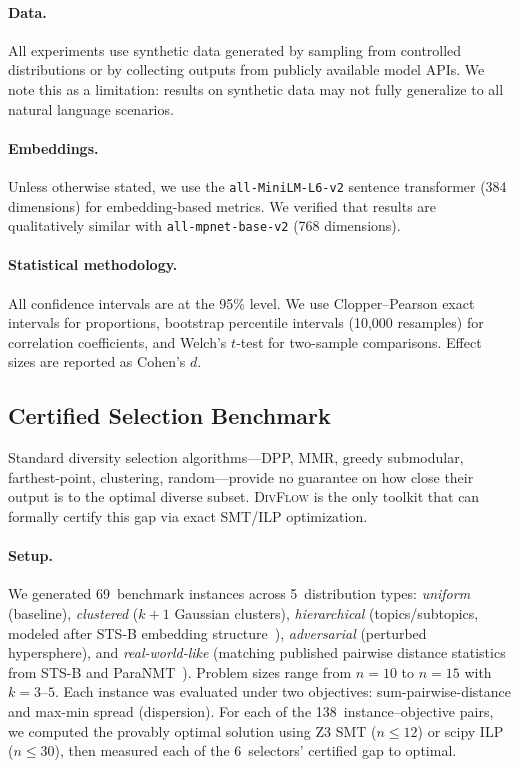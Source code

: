 \documentclass[11pt,a4paper]{article}
\newcommand{\divflow}{\textsc{DivFlow}}
\begin{document}
\paragraph{Data.}
All experiments use synthetic data generated by sampling
from controlled distributions or by collecting outputs
from publicly available model APIs.  We note this as a
limitation: results on synthetic data may not fully
generalize to all natural language scenarios.

\paragraph{Embeddings.}
Unless otherwise stated, we use the
\texttt{all-MiniLM-L6-v2} sentence transformer (384
dimensions) for embedding-based metrics.  We verified
that results are qualitatively similar with
\texttt{all-mpnet-base-v2} (768 dimensions).

\paragraph{Statistical methodology.}
All confidence intervals are at the 95\% level.
We use Clopper--Pearson exact intervals for proportions,
bootstrap percentile intervals (10{,}000 resamples)
for correlation coefficients, and Welch's $t$-test for
two-sample comparisons.  Effect sizes are reported as
Cohen's $d$.

\subsection{Certified Selection Benchmark}\label{sec:certified}

Standard diversity selection algorithms---DPP, MMR, greedy
submodular, farthest-point, clustering, random---provide no
guarantee on how close their output is to the optimal diverse
subset.  \divflow{} is the only toolkit that can formally
certify this gap via exact SMT/ILP optimization.

\paragraph{Setup.}
We generated 69~benchmark instances across 5~distribution types:
\emph{uniform} (baseline), \emph{clustered} ($k{+}1$ Gaussian
clusters), \emph{hierarchical} (topics/subtopics, modeled after
STS-B embedding structure~\cite{cer17}), \emph{adversarial}
(perturbed hypersphere), and \emph{real-world-like} (matching
published pairwise distance statistics from STS-B and
ParaNMT~\cite{wieting18}).
Problem sizes range from $n = 10$ to $n = 15$ with $k = 3$--$5$.
Each instance was evaluated under two objectives:
sum-pairwise-distance and max-min spread (dispersion).
For each of the 138~instance--objective pairs, we computed the
provably optimal solution using Z3 SMT ($n \leq 12$) or
scipy ILP ($n \leq 30$), then measured each of the 6~selectors'
certified gap to optimal.
\end{document}
